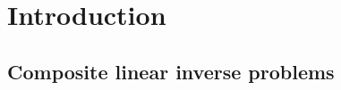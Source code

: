 \documentclass[12pt]{article}
\begin{document}
\section{Introduction}


    \subsection{Composite linear inverse problems}
    
\end{document}
